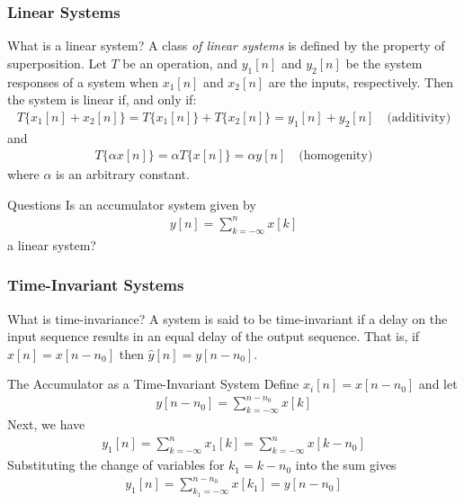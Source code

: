 \documentclass[mathserif,9pt,handout]{beamer}
\begin{document}
\begin{frame}\frametitle{Linear Systems}\small
  \begin{block}{What is a linear system?}
    A class {\em of linear systems} is defined by the property of superposition. Let $T$ be an operation, and $y_1[n]$ and $y_2[n]$ be the system responses of a system when $x_1[n]$ and $x_2[n]$ are the inputs, respectively. Then the system is linear if, and only if: 
    \begin{align}
      T\{x_1[n] + x_2[n]\} = T\{x_1[n]\} + T\{x_2[n]\} = y_1[n] + y_2[n]  \hspace{1em} \textrm{(additivity)}
      \nonumber
    \end{align}
    and 
    \begin{align}
      T\{ \alpha x[n]\} = \alpha T\{  x[n]\} = \alpha y[n] \hspace{1em} \textrm{(homogenity)}
      \nonumber
    \end{align}
    where $\alpha$ is an arbitrary constant. 
  \end{block}
  
  \begin{exampleblock}{Questions}
    Is an accumulator system given by  
    \begin{align}
      y[n] = \sum_{k=-\infty}^{n} x[k]
      \nonumber
    \end{align}
    a linear system?
  \end{exampleblock}
\end{frame}

\begin{frame}\frametitle{Time-Invariant Systems}\small
  \begin{block}{What is time-invariance?}
    A system is said to be time-invariant if a delay on the input sequence results in an equal delay of the output sequence. That is, if $\hat{x}[n] = x[n-n_0]$ then $\hat{y}[n] = y[n-n_0]$. 
  \end{block}
  
  \begin{exampleblock}{The Accumulator as a Time-Invariant System}
    Define $x_i[n] = x[n-n_0]$ and let
    \begin{align}
    y[n - n_0] = \sum_{k=-\infty}^{n-n_0}x[k] \nonumber
    \end{align}
    Next, we have 
    \begin{align}
    y_1[n] = \sum_{k=-\infty}^{n}x_1[k] = \sum_{k=-\infty}^{n}x[k-n_0]\nonumber
    \end{align}
    Substituting the change of variables for $k_1=k-n_0$ into the sum gives
    \begin{align}
      y_1[n] = \sum_{k_1=-\infty}^{n-n_0}x[k_1] = y[n-n_0] 
      \nonumber
    \end{align}
  \end{exampleblock}
\end{frame}
\end{document}
